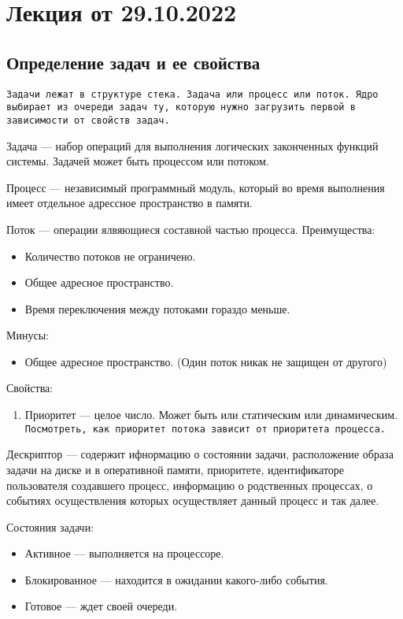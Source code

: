 
\section{Лекция от 29.10.2022}
\subsection{Определение задач и ее свойства}
\texttt{Задачи лежат в структуре стека. Задача или процесс или поток. Ядро выбирает из
очереди задач ту, которую нужно загрузить первой в зависимости от свойств
задач.}\par

Задача --- набор операций для выполнения логических законченных функций
системы. Задачей может быть процессом или потоком.\par

Процесс --- независимый программный модуль, который во время выполнения имеет
отдельное адрессное пространство в памяти.\par

Поток --- операции ялвяющиеся составной частью процесса. Преимущества:
\begin{itemize}
  \item  Количество потоков не ограничено.
  \item Общее адресное пространство. 
  \item Время переключения между потоками гораздо меньше.
\end{itemize}
Минусы:
\begin{itemize}
  \item Общее адресное пространство. (Один поток никак не защищен от другого)
\end{itemize}
Свойства:
\begin{enumerate}
  \item Приоритет --- целое число. Может быть или статическим или динамическим.
    \texttt{Посмотреть, как приоритет потока зависит от приоритета процесса.}
\end{enumerate}\par

Дескриптор --- содержит ифнормацию о состоянии задачи, расположение образа задачи
на диске и в оперативной памяти, приоритете, идентификаторе пользователя
создавшего процесс, информацию о родственных процессах, о событиях осуществления
которых осуществляет данный процесс и так далее.\par

Состояния задачи:
\begin{itemize}
  \item Активное --- выполняется на процессоре.
  \item Блокированное --- находится в ожидании какого-либо события.
  \item Готовое --- ждет своей очереди.
\end{itemize}\par

